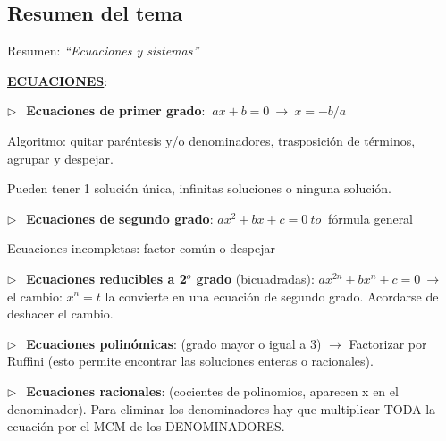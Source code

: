 \newpage
\begin{small}
\section{Resumen del tema}
\vspace{1cm}

\begin{myblock}{Resumen: \emph{``Ecuaciones y sistemas''}}

\vspace{2mm} \textbf{\underline{ECUACIONES}}:

\vspace{4mm} $\triangleright \ \ $ \textbf{Ecuaciones de primer grado}: $\ ax+b = 0   \ \to \ x=-b/a$

\vspace{2mm} Algoritmo:  quitar paréntesis y/o denominadores, trasposición de términos, agrupar y despejar.

\vspace{2mm} Pueden tener 1 solución única, infinitas soluciones o ninguna solución.


\vspace{4mm} $\triangleright \ \ $ \textbf{Ecuaciones de segundo grado}:  $ax^2 + bx + c = 0  \ to \  $ fórmula general  

\vspace{2mm} Ecuaciones incompletas: factor común o despejar

\vspace{4mm} $\triangleright \ \ $ \textbf{Ecuaciones reducibles a 2$^o$ grado} (bicuadradas):  $ax^{2n}+bx^n+c=0  \ \to \ $  el cambio: $x^n=t$ la convierte en una ecuación de segundo grado. Acordarse de deshacer el cambio.

\vspace{4mm} $\triangleright \ \ $ \textbf{Ecuaciones polinómicas}:  (grado mayor o igual a 3) $\to$ Factorizar por Ruffini (esto permite encontrar las soluciones enteras o racionales).

\vspace{4mm} $\triangleright \ \ $ \textbf{Ecuaciones racionales}: (cocientes de polinomios, aparecen x en el denominador). Para eliminar los denominadores hay que multiplicar TODA la ecuación por el MCM de los DENOMINADORES.


\end{myblock}
\end{small}

